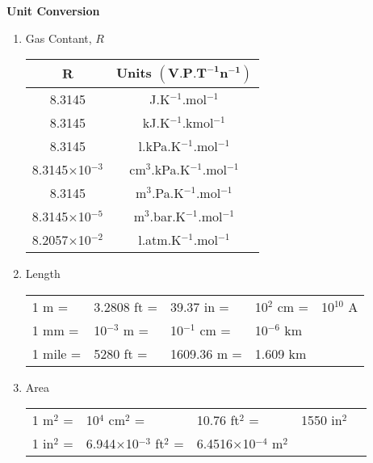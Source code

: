 \documentclass[12pts,a4paper,amsmath,amssymb,floatfix]{article}%
\begin{document}
\begin{center}
  {\Large {\bf Unit Conversion}}
\end{center}

\begin{enumerate}[1)]
\item Gas Contant, $R$ %
     \begin{center}
     \begin{tabular}{|c c|}
       \hline
           $\mathbf{R}$   & {\bf Units} $\mathbf{\left(\text{V.P.T}^{-1}\text{n}^{-1}\right)}$ \\
           \hline\hline
           8.3145    &  J.K$^{-1}$.mol$^{-1}$  \\
           8.3145    &  kJ.K$^{-1}$.kmol$^{-1}$  \\
           8.3145    &  l.kPa.K$^{-1}$.mol$^{-1}$  \\
           8.3145$\times$10$^{-3}$    & cm$^{3}$.kPa.K$^{-1}$.mol$^{-1}$  \\
           8.3145    &  m$^{3}$.Pa.K$^{-1}$.mol$^{-1}$  \\
           8.3145$\times$10$^{-5}$    &  m$^{3}$.bar.K$^{-1}$.mol$^{-1}$  \\
           8.2057$\times$10$^{-2}$ &  l.atm.K$^{-1}$.mol$^{-1}$  \\
           \hline         
     \end{tabular}
     \end{center}
     
\item Length %
     \begin{center}
     \begin{tabular}{|l l l l l|}
       \hline
       1 m =& 3.2808 ft =& 39.37 in =& 10$^{2}$ cm =& 10$^{10}$ A \\
       1 mm =& 10$^{-3}$ m =& 10$^{-1}$ cm =& 10$^{-6}$ km &       \\
       1 mile =& 5280 ft =& 1609.36 m =& 1.609 km &             \\
       \hline           
     \end{tabular}
     \end{center}
          
\item Area %
     \begin{center}
     \begin{tabular}{|l l l l l|}
       \hline
       1 m$^{2}$ =& 10$^{4}$ cm$^{2}$ =& 10.76 ft$^{2}$ =& 1550 in$^{2}$ & \\
       1 in$^{2}$ =& 6.944$\times$10$^{-3}$ ft$^{2}$ =& 6.4516$\times$10$^{-4}$ m$^{2}$ & & \\
       \hline           
     \end{tabular}
     \end{center}
          

\end{enumerate}
\end{document}
